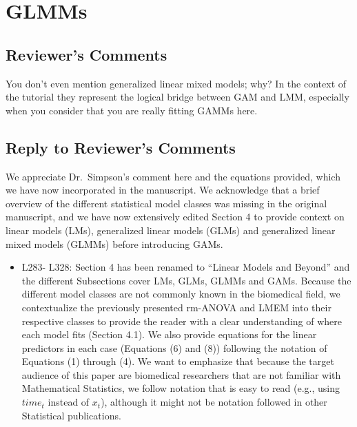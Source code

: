 \documentclass[
]{article}
\providecommand{\tightlist}{%
  \setlength{\itemsep}{0pt}\setlength{\parskip}{0pt}}
\begin{document}
\hypertarget{glmms}{%
\section{GLMMs}\label{glmms}}

\hypertarget{reviewers-comments-2}{%
\subsection{Reviewer's Comments}\label{reviewers-comments-2}}

You don't even mention generalized linear mixed models; why? In the context of the tutorial they represent the logical bridge between GAM and LMM, especially when you consider that you are really fitting GAMMs here.

\hypertarget{section-3}{%
\subsection{\texorpdfstring{\textcolor{reviewersblue} {Reply to Reviewer's Comments}}{}}\label{section-3}}

We appreciate Dr.~Simpson's comment here and the equations provided, which we have now incorporated in the manuscript. We acknowledge that a brief overview of the different statistical model classes was missing in the original manuscript, and we have now extensively edited Section 4 to provide context on linear models (LMs), generalized linear models (GLMs) and generalized linear mixed models (GLMMs) before introducing GAMs.

\begin{itemize}
\tightlist
\item
  L283- L328: Section 4 has been renamed to ``Linear Models and Beyond'' and the different Subsections cover LMs, GLMs, GLMMs and GAMs. Because the different model classes are not commonly known in the biomedical field, we contextualize the previously presented rm-ANOVA and LMEM into their respective classes to provide the reader with a clear understanding of where each model fits (Section 4.1). We also provide equations for the linear predictors in each case (Equations (6) and (8)) following the notation of Equations (1) through (4). We want to emphasize that because the target audience of this paper are biomedical researchers that are not familiar with Mathematical Statistics, we follow notation that is easy to read (e.g., using \(time_t\) instead of \(x_t\)), although it might not be notation followed in other Statistical publications.
\end{itemize}
\end{document}
